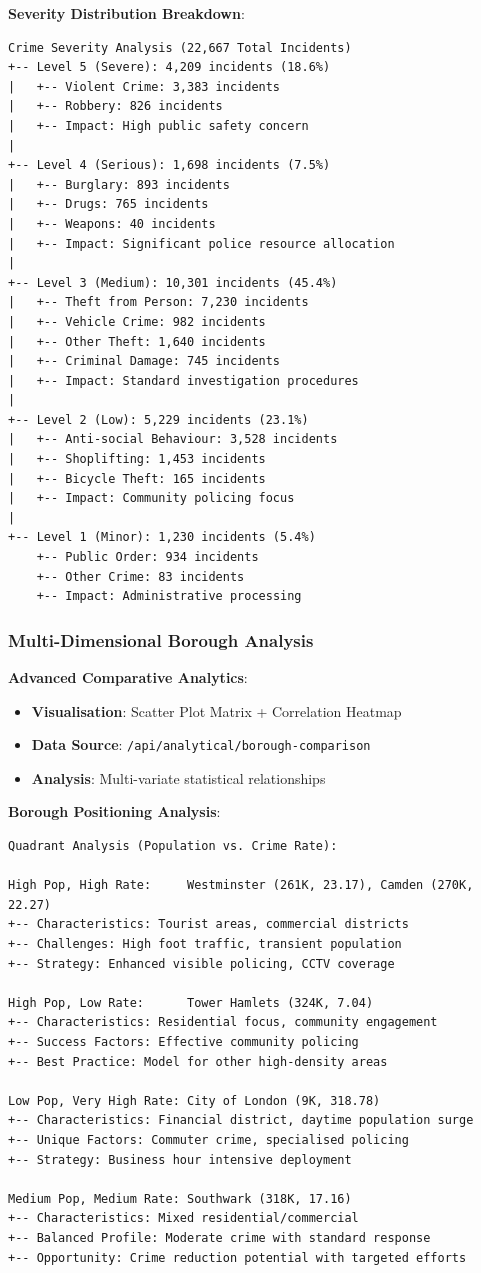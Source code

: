 \documentclass[12pt,a4paper]{article}
\begin{document}
\textbf{Severity Distribution Breakdown}:
\begin{verbatim}
Crime Severity Analysis (22,667 Total Incidents)
+-- Level 5 (Severe): 4,209 incidents (18.6%)
|   +-- Violent Crime: 3,383 incidents
|   +-- Robbery: 826 incidents
|   +-- Impact: High public safety concern
|
+-- Level 4 (Serious): 1,698 incidents (7.5%)
|   +-- Burglary: 893 incidents
|   +-- Drugs: 765 incidents
|   +-- Weapons: 40 incidents
|   +-- Impact: Significant police resource allocation
|
+-- Level 3 (Medium): 10,301 incidents (45.4%)
|   +-- Theft from Person: 7,230 incidents
|   +-- Vehicle Crime: 982 incidents
|   +-- Other Theft: 1,640 incidents
|   +-- Criminal Damage: 745 incidents
|   +-- Impact: Standard investigation procedures
|
+-- Level 2 (Low): 5,229 incidents (23.1%)
|   +-- Anti-social Behaviour: 3,528 incidents
|   +-- Shoplifting: 1,453 incidents
|   +-- Bicycle Theft: 165 incidents
|   +-- Impact: Community policing focus
|
+-- Level 1 (Minor): 1,230 incidents (5.4%)
    +-- Public Order: 934 incidents
    +-- Other Crime: 83 incidents
    +-- Impact: Administrative processing
\end{verbatim}

\subsubsection{Multi-Dimensional Borough Analysis}

\textbf{Advanced Comparative Analytics}:
\begin{itemize}
    \item \textbf{Visualisation}: Scatter Plot Matrix + Correlation Heatmap
    \item \textbf{Data Source}: \texttt{/api/analytical/borough-comparison}
    \item \textbf{Analysis}: Multi-variate statistical relationships
\end{itemize}

\textbf{Borough Positioning Analysis}:
\begin{verbatim}
Quadrant Analysis (Population vs. Crime Rate):

High Pop, High Rate:     Westminster (261K, 23.17), Camden (270K, 22.27)
+-- Characteristics: Tourist areas, commercial districts
+-- Challenges: High foot traffic, transient population
+-- Strategy: Enhanced visible policing, CCTV coverage

High Pop, Low Rate:      Tower Hamlets (324K, 7.04)
+-- Characteristics: Residential focus, community engagement
+-- Success Factors: Effective community policing
+-- Best Practice: Model for other high-density areas

Low Pop, Very High Rate: City of London (9K, 318.78)
+-- Characteristics: Financial district, daytime population surge
+-- Unique Factors: Commuter crime, specialised policing
+-- Strategy: Business hour intensive deployment

Medium Pop, Medium Rate: Southwark (318K, 17.16)
+-- Characteristics: Mixed residential/commercial
+-- Balanced Profile: Moderate crime with standard response
+-- Opportunity: Crime reduction potential with targeted efforts
\end{verbatim}
\end{document}
